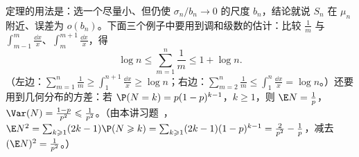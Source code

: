 定理的用法是：选一个尽量小、但仍使 $\sigma_n/b_n\to0$ 的尺度 $b_n$，结论就说 $S_n$ 在 $\mu_n$ 附近、误差为 $o(b_n)$。下面三个例子中要用到调和级数的估计：比较 $\frac1m$ 与 $\int_{m-1}^m\frac{\dd x}x$、$\int_m^{m+1}\frac{\dd x}x$，得
\begin{equation}\label{eq:weak-laws:harmonic}
\log n\leqslant\sum_{m=1}^n\frac1m\leqslant1+\log n .
\end{equation}
（左边：$\sum_{m=1}^n\frac1m\geqslant\int_1^{n+1}\frac{\dd x}x\geqslant\log n$；右边：$\sum_{m=2}^n\frac1m\leqslant\int_1^n\frac{\dd x}x=\log n$。）还要用到几何分布的方差：若 $\P(N=k)=p(1-p)^{k-1}$，$k\geqslant1$，则 $\E N=\frac1p$，$\Var(N)=\frac{1-p}{p^2}\leqslant\frac1{p^2}$。（由本讲习题~，$\E N^2=\sum_{k\geqslant1}(2k-1)\P(N\geqslant k)=\sum_{k\geqslant1}(2k-1)(1-p)^{k-1}=\frac2{p^2}-\frac1p$，减去 $(\E N)^2=\frac1{p^2}$。）

